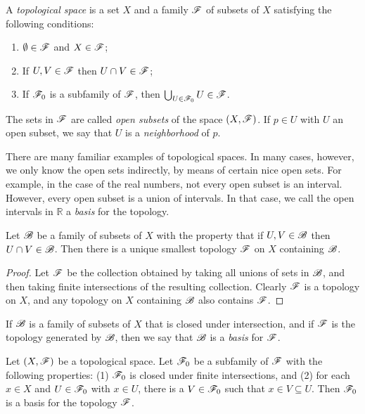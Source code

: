 \begin{defn} A \emph{topological space} is a set $X$ and a family
  $\mathscr F$ of subsets of $X$ satisfying the following conditions:
\begin{enumerate}
\item $\emptyset\in \mathscr F$ and $X\in \mathscr F$;
\item If $U,V\in \mathscr F$ then $U\cap V\in \mathscr F$;
\item If $\mathscr F _0$ is a subfamily of $\mathscr F$, then $\bigcup _{U\in \mathscr F
    _0}U\in \mathscr F$.
\end{enumerate}
The sets in $\mathscr F$ are called \emph{open subsets} of the space $(X,\mathscr F
)$.  If $p\in U$ with $U$ an open subset, we say that $U$ is a
\emph{neighborhood} of $p$.
\end{defn}



There are many familiar examples of topological spaces.  In many
cases, however, we only know the open sets indirectly, by means of
certain nice open sets.  For example, in the case of the real numbers,
not every open subset is an interval.  However, every open subset is a
union of intervals.  In that case, we call the open intervals in
$\mathbb{R}$ a \emph{basis} for the topology.

\begin{prop} Let $\mathscr B$ be a family of subsets of $X$ with the property
  that if $U,V\in \mathscr B$ then $U\cap V\in \mathscr B$.  Then there is a unique
  smallest topology $\mathscr F$ on $X$ containing $\mathscr B$.  \end{prop}

\begin{proof} Let $\mathscr F$ be the collection obtained by taking all
  unions of sets in $\mathscr B$, and then taking finite intersections of the
  resulting collection.  Clearly $\mathscr F$ is a topology on $X$, and any
  topology on $X$ containing $\mathscr B$ also contains $\mathscr F$. \end{proof}

\begin{defn} If $\mathscr B$ is a family of subsets of $X$ that is closed
  under intersection, and if $\mathscr F$ is the topology generated by $\mathscr B$,
  then we say that $\mathscr B$ is a \emph{basis} for $\mathscr F$. \end{defn}

\begin{prop} Let $(X,\mathscr F )$ be a topological space.  Let $\mathscr F_0$ be a
  subfamily of $\mathscr F$ with the following properties: (1) $\mathscr F_0$ is
  closed under finite intersections, and (2) for each $x\in X$ and
  $U\in \mathscr F_0$ with $x\in U$, there is a $V\in\mathscr F _0$ such that $x\in
  V\subseteq U$.  Then $\mathscr F _0$ is a basis for the topology
  $\mathscr F$. \end{prop}

